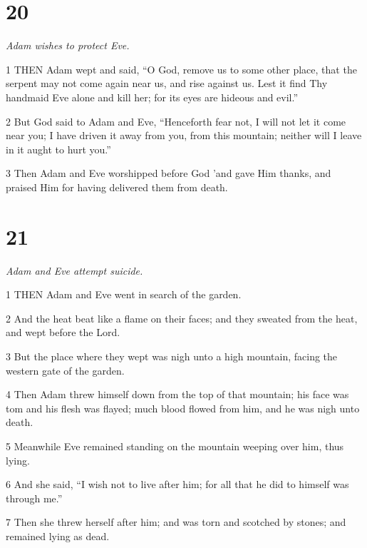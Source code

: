 \chapter{20}

\par \textit{Adam wishes to protect Eve.}

\par 1 THEN Adam wept and said, “O God, remove us to some other place, that the serpent may not come again near us, and rise against us. Lest it find Thy handmaid Eve alone and kill her; for its eyes are hideous and evil.”

\par 2 But God said to Adam and Eve, “Henceforth fear not, I will not let it come near you; I have driven it away from you, from this mountain; neither will I leave in it aught to hurt you.”

\par 3 Then Adam and Eve worshipped before God 'and gave Him thanks, and praised Him for having delivered them from death.

\chapter{21}

\par \textit{Adam and Eve attempt suicide.}

\par 1 THEN Adam and Eve went in search of the garden.

\par 2 And the heat beat like a flame on their faces; and they sweated from the heat, and wept before the Lord.

\par 3 But the place where they wept was nigh unto a high mountain, facing the western gate of the garden.

\par 4 Then Adam threw himself down from the top of that mountain; his face was tom and his flesh was flayed; much blood flowed from him, and he was nigh unto death.

\par 5 Meanwhile Eve remained standing on the mountain weeping over him, thus lying.

\par 6 And she said, “I wish not to live after him; for all that he did to himself was through me.”

\par 7 Then she threw herself after him; and was torn and scotched by stones; and remained lying as dead.

